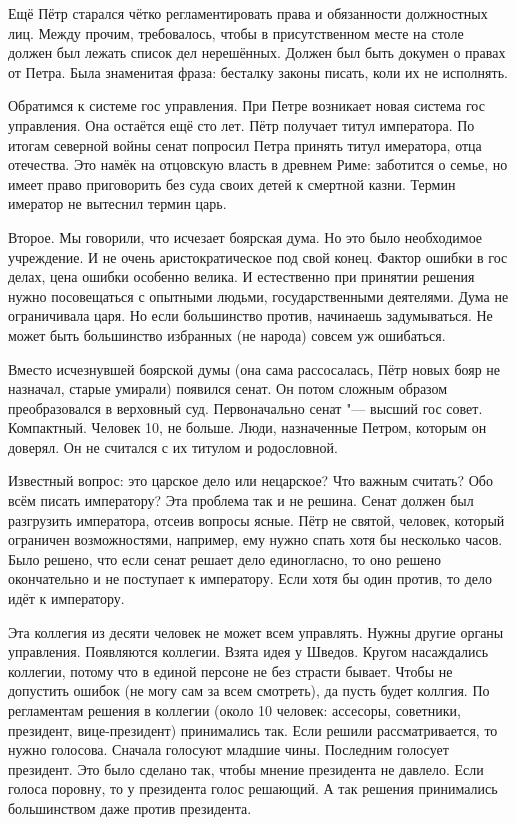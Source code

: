 Ещё Пётр старался чётко регламентировать права и обязанности должностных лиц. Между прочим, требовалось, чтобы в присутственном месте на столе должен был лежать список дел нерешённых. Должен был быть докумен о правах от Петра. Была знаменитая фраза: бесталку законы писать, коли их не исполнять.

Обратимся к системе гос управления. При Петре возникает новая система гос управления. Она остаётся ещё сто лет. Пётр получает титул императора. По итогам северной войны сенат попросил Петра принять титул имератора, отца отечества. Это намёк на отцовскую власть в древнем Риме: заботится о семье, но имеет право приговорить без суда своих детей к смертной казни. Термин имератор не вытеснил термин царь.

Второе. Мы говорили, что исчезает боярская дума. Но это было необходимое учреждение. И не очень аристократическое под свой конец. Фактор ошибки в гос делах, цена ошибки особенно велика. И естественно при принятии решения нужно посовещаться с опытными людьми, государственными деятелями. Дума не ограничивала царя. Но если большинство против, начинаешь задумываться. Не может быть большинство избранных (не народа) совсем уж ошибаться.

Вместо исчезнувшей боярской думы (она сама рассосалась, Пётр новых бояр не назначал, старые умирали) появился сенат. Он потом сложным образом преобразовался в верховный суд. Первоначально сенат "--- высший гос совет. Компактный. Человек 10, не больше. Люди, назначенные Петром, которым он доверял. Он не считался с их титулом и родословной.

Известный вопрос: это царское дело или нецарское? Что важным считать? Обо всём писать императору? Эта проблема так и не решина.
Сенат должен был разгрузить императора, отсеив вопросы ясные. Пётр не святой, человек, который ограничен возможностями, например, ему нужно спать хотя бы несколько часов. Было решено, что если сенат решает дело единогласно, то оно решено окончательно и не поступает к императору. Если хотя бы один против, то дело идёт к императору.

Эта коллегия из десяти человек не может всем управлять. Нужны другие органы управления. Появляются коллегии. Взята идея у Шведов. Кругом насаждались коллегии, потому что в единой персоне не без страсти бывает. Чтобы не допустить ошибок (не могу сам за всем смотреть), да пусть будет коллгия. По регламентам решения в коллегии (около 10 человек: ассесоры, советники, президент, вице-президент) принимались так. Если решили рассматривается, то нужно голосова. Сначала голосуют младшие чины. Последним голосует президент. Это было сделано так, чтобы мнение президента не давлело. Если голоса поровну, то у президента голос решающий. А так решения принимались большинством даже против президента.

